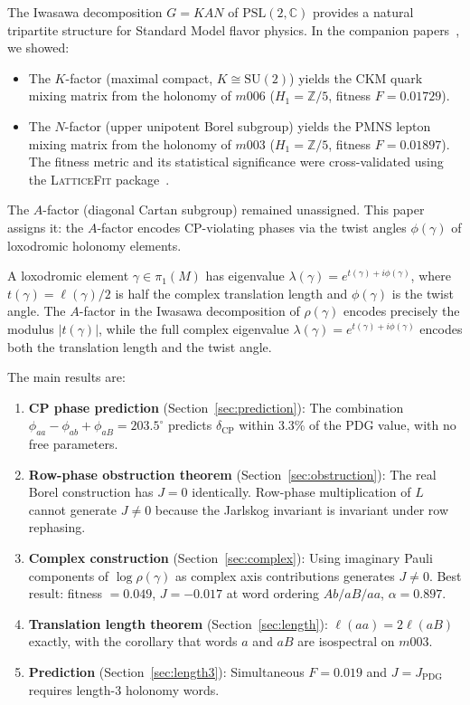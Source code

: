 \documentclass[11pt,a4paper]{article}
\begin{document}
The Iwasawa decomposition $G = KAN$ of $\mathrm{PSL}(2,\mathbb{C})$
provides a natural tripartite structure for Standard Model flavor
physics.  In the companion papers~\cite{Gentry2026c,Gentry2026b}, we
showed:
\begin{itemize}
  \item The $K$-factor (maximal compact, $K \cong \mathrm{SU}(2)$)
    yields the CKM quark mixing matrix from the holonomy of $m006$
    ($H_1 = \mathbb{Z}/5$, fitness $F = 0.01729$).
  \item The $N$-factor (upper unipotent Borel subgroup) yields the
    PMNS lepton mixing matrix from the holonomy of $m003$
    ($H_1 = \mathbb{Z}/5$, fitness $F = 0.01897$).  The fitness
    metric and its statistical significance were cross-validated using
    the \textsc{LatticeFit} package~\cite{Gentry2026a}.
\end{itemize}

The $A$-factor (diagonal Cartan subgroup) remained unassigned.  This
paper assigns it: the $A$-factor encodes CP-violating phases via the
twist angles $\phi(\gamma)$ of loxodromic holonomy elements.

A loxodromic element $\gamma \in \pi_1(M)$ has eigenvalue
$\lambda(\gamma) = e^{t(\gamma)+i\phi(\gamma)}$, where
$t(\gamma) = \ell(\gamma)/2$ is half the complex translation length
and $\phi(\gamma)$ is the twist angle.  The $A$-factor in the Iwasawa
decomposition of $\rho(\gamma)$ encodes precisely the modulus
$|t(\gamma)|$, while the full complex eigenvalue
$\lambda(\gamma) = e^{t(\gamma)+i\phi(\gamma)}$ encodes both the
translation length and the twist angle.

The main results are:
\begin{enumerate}
  \item \textbf{CP phase prediction} (Section~\ref{sec:prediction}):
    The combination $\phi_{aa} - \phi_{ab} + \phi_{aB} = 203.5^\circ$
    predicts $\delta_{\mathrm{CP}}$ within 3.3\% of the PDG value,
    with no free parameters.
  \item \textbf{Row-phase obstruction theorem}
    (Section~\ref{sec:obstruction}): The real Borel construction has
    $J = 0$ identically.  Row-phase multiplication of $L$ cannot
    generate $J \neq 0$ because the Jarlskog invariant is invariant
    under row rephasing.
  \item \textbf{Complex construction} (Section~\ref{sec:complex}):
    Using imaginary Pauli components of $\log\rho(\gamma)$ as complex
    axis contributions generates $J \neq 0$.  Best result: fitness
    $= 0.049$, $J = -0.017$ at word ordering $Ab/aB/aa$, $\alpha = 0.897$.
  \item \textbf{Translation length theorem}
    (Section~\ref{sec:length}): $\ell(aa) = 2\ell(aB)$ exactly, with
    the corollary that words $a$ and $aB$ are isospectral on $m003$.
  \item \textbf{Prediction} (Section~\ref{sec:length3}): Simultaneous
    $F = 0.019$ and $J = J_{\mathrm{PDG}}$ requires length-3
    holonomy words.
\end{enumerate}
\end{document}
